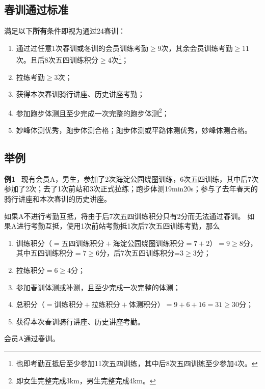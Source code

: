 \documentclass[UTF8]{ctexart}
\begin{document}
\subsection{春训通过标准}

满足以下\textbf{所有}条件即视为通过24春训：
\begin{enumerate}[nosep,left=4em]
    \item 通过过任意1次春训或冬训的会员训练考勤$\ge 9$次，其余会员训练考勤$\ge 11$次。且后8次五四训练积分$\ge 4$次\footnote{也即考勤互抵后至少参加11次五四训练，其中后8次五四训练至少参加4次。}；
    \item 拉练考勤$\ge 3$次；
    \item 获得本次春训骑行讲座、历史讲座考勤；
    \item 参加跑步体测且至少完成一次完整的跑步体测\footnote{即女生完整完成3km，男生完整完成4km。}；
    \item 妙峰体测优秀，跑步体测合格；跑步体测或平路体测优秀，妙峰体测合格。
\end{enumerate}

\subsection{举例}
\small{
    \textbf{例1} \ 现有会员A，男生，参加了2次海淀公园绕圈训练，6次五四训练，其中后7次参加了2次；去了1次前站和3次正式拉练；跑步体测19min20s；参与了去年春天的骑行讲座和本次春训的历史讲座。

如果A不进行考勤互抵，将由于后7次五四训练积分只有2分而无法通过春训。
如果A进行考勤互抵，使用1次前站考勤抵1次后7次五四训练考勤，那么
\begin{enumerate}[nosep,left=4em]
    \item 训练积分（$=\text{五四训练积分}+\text{海淀公园绕圈训练积分}=7+2$）$=9\ge 8$分，其中五四训练积分$=7\ge 6$分，后7次五四训练积分=3$\ge 3$分；
    \item 拉练积分$=6\ge 4$分；
    \item 参加春训体测或补测，且至少完成一次完整的体测；
    \item 总积分（$=\text{训练积分}+\text{拉练积分}+\text{体测积分}$）$=9+6+16=31\ge 30$分；
    \item 获得本次春训骑行讲座、历史讲座考勤。
\end{enumerate}

会员A通过春训。\\
}
\end{document}
